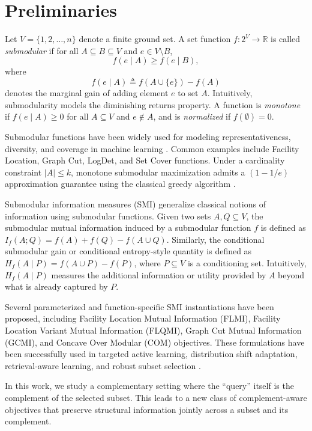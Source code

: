 \documentclass[11pt]{article}
\begin{document}
\section{Preliminaries}

Let $V=\{1,2,\dots,n\}$ denote a finite ground set. A set function $f:2^V \rightarrow \mathbb{R}$ is called \emph{submodular} if for all $A \subseteq B \subseteq V$ and $e \in V \setminus B$,
\[
f(e \mid A) \ge f(e \mid B),
\]
where
\[
f(e \mid A) \triangleq f(A \cup \{e\}) - f(A)
\]
denotes the marginal gain of adding element $e$ to set $A$. Intuitively, submodularity models the diminishing returns property. A function is \emph{monotone} if $f(e \mid A) \ge 0$ for all $A \subseteq V$ and $e \notin A$, and is \emph{normalized} if $f(\emptyset)=0$.

Submodular functions have been widely used for modeling representativeness, diversity, and coverage in machine learning \cite{fujishige2005submodular, krause2014submodular, bilmes2022submodularity,iyer2015polyhedral}. Common examples include Facility Location, Graph Cut, LogDet, and Set Cover functions. Under a cardinality constraint $|A|\le k$, monotone submodular maximization admits a $(1-1/e)$ approximation guarantee using the classical greedy algorithm \cite{nemhauser1978analysis}.

Submodular information measures (SMI) \cite{iyer2021submodular, iyer2021generalized} generalize classical notions of information using submodular functions. Given two sets $A,Q \subseteq V$, the submodular mutual information induced by a submodular function $f$ is defined as
$I_f(A;Q)
=
f(A) + f(Q) - f(A \cup Q)$.
Similarly, the conditional submodular gain or conditional entropy-style quantity is defined as
$H_f(A \mid P)
=
f(A \cup P) - f(P)$,
where $P \subseteq V$ is a conditioning set. Intuitively, $H_f(A \mid P)$ measures the additional information or utility provided by $A$ beyond what is already captured by $P$.

Several parameterized and function-specific SMI instantiations have been proposed, including Facility Location Mutual Information (FLMI), Facility Location Variant Mutual Information (FLQMI), Graph Cut Mutual Information (GCMI), and Concave Over Modular (COM) objectives. These formulations have been successfully used in targeted active learning, distribution shift adaptation, retrieval-aware learning, and robust subset selection \cite{kothawade2021similar, kothawade2022talisman, karanam2022orient, kothawade2022active}.

In this work, we study a complementary setting where the ``query'' itself is the complement of the selected subset. This leads to a new class of complement-aware objectives that preserve structural information jointly across a subset and its complement.
\end{document}
